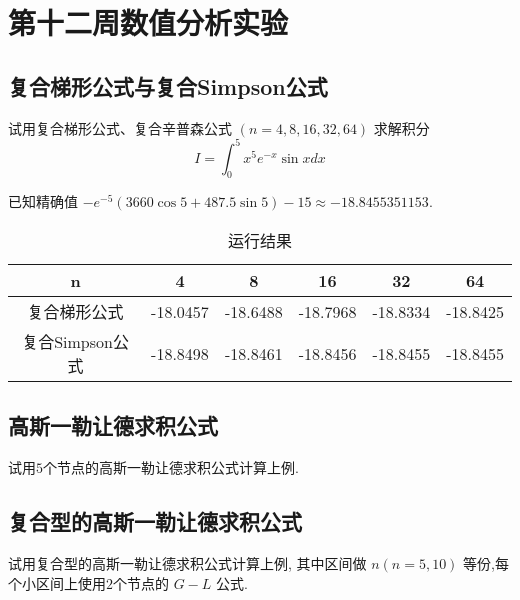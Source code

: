 \section{第十二周数值分析实验}
\subsection{复合梯形公式与复合Simpson公式}
\begin{ex}
	试用复合梯形公式、复合辛普森公式 $(n=4,8,16,32,64)$ 求解积分
	$$
	I=\int_0^5 x^5 e^{-x} \sin x d x
	$$
	
	已知精确值 $-e^{-5}(3660 \cos 5+487.5 \sin 5)-15 \approx-18.8455351153$.
\end{ex}

\qa 
\begin{table}[H]
	\centering
	\caption{运行结果}
	\begin{tabular}{c|ccccc}
		n     & 4     & 8     & 16    & 32    & 64 \\
		\hline
		复合梯形公式 & -18.0457 & -18.6488 & -18.7968 & -18.8334 & -18.8425 \\
		复合Simpson公式 & -18.8498 & -18.8461 & -18.8456 & -18.8455 & -18.8455 \\
	\end{tabular}%
	\label{tab:addlabel12}%
\end{table}%

\subsection{高斯一勒让德求积公式}
\begin{ex}
	试用$5$个节点的高斯一勒让德求积公式计算上例.
\end{ex}

\subsection{复合型的高斯一勒让德求积公式}
\begin{ex}
	试用复合型的高斯一勒让德求积公式计算上例, 其中区间做 $n(n=5,10)$ 等份,每个小区间上使用$2$个节点的 $G-L$ 公式.
\end{ex}

\qa [-18.8454781687866,-18.8455360298194]